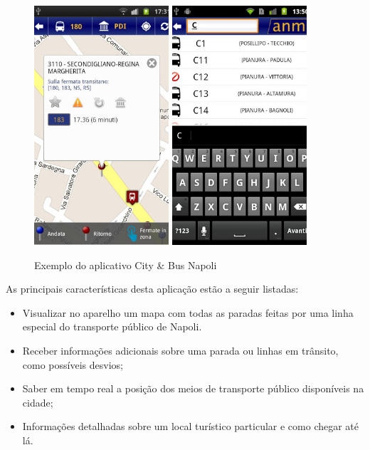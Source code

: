 \begin{figure}[htp]
\begin{center}
  \includegraphics[width=5cm]{images/citybus.png}
    \includegraphics[width=5cm]{images/citybus2.png}
  \caption{Exemplo do aplicativo City \& Bus Napoli}
  \label{fig:exampleCity}
\end{center}
\end{figure}

As principais características desta aplicação estão a seguir listadas:

\begin{itemize}
\item Visualizar no aparelho um mapa com todas as paradas feitas por uma linha especial do transporte público de Napoli. 
\item Receber informações adicionais sobre uma parada ou linhas em trânsito, como possíveis desvios; 
\item Saber em tempo real a posição dos meios de transporte público disponíveis na cidade;
\item Informações detalhadas sobre um local turístico particular e como chegar até lá.
\end{itemize}

